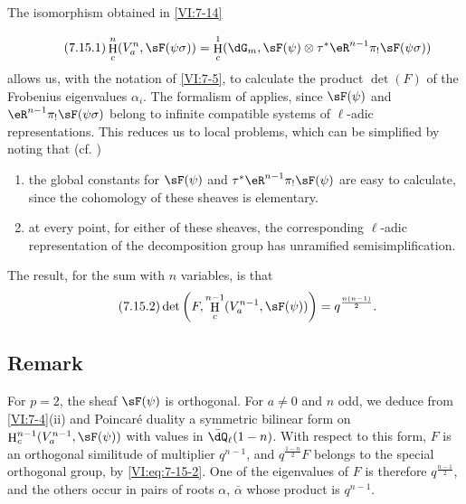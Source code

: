 \documentclass[oneside]{book}
\DeclareMathOperator{\h}{H}
\theoremstyle{sga-source}
\theoremstyle{sga-source-dash}
\theoremstyle{sga-source-dotdash}
\theoremstyle{sga-source-number-note-dash}
\theoremstyle{sga-source-note-number-dotdash}
\theoremstyle{sga-source-example-dotdash}
\theoremstyle{sga-source-inline-number}
\theoremstyle{sga-source-bare-number}
\theoremstyle{sga-source}
\newcommand{\PrintPage}[1]{}\newcommand{\MathPage}[1]{}\newcommand{\PrintCite}[2]{#1}\newcommand{\var}[3]{#2}
\begin{document}
The isomorphism obtained in \ref{VI:7-14} 
\PrintPage{226}
\begin{equation*}\tag{7.15.1}\label{VI:eq:7-15-1}
  \h_c^n(V_a^n,\sF(\psi\sigma)) = \h_c^1(\dG_m,\sF(\psi)\otimes \tau^\ast \eR^{n-1} \pi_! \sF(\psi\sigma)) 
\end{equation*}
allows us, with the notation of \ref{VI:7-5}, to calculate the product $\det(F)$ 
of the Frobenius eigenvalues $\alpha_i$. The formalism of \cite{de73} 
applies, since $\sF(\psi)$ and $\eR^{n-1} \pi_! \sF(\psi\sigma)$ 
belong to infinite compatible systems of $\ell$-adic 
representations. This reduces us to local problems, which can be 
simplified by noting that (cf. \cite[9.5]{de73}) 
\begin{enumerate}[\indent a)]
  \item the global constants for 
    $\sF(\psi)$ and $\tau^\ast \eR^{n-1} \pi_! \sF(\psi)$ are easy to calculate, since the cohomology of these sheaves is elementary. 
  \item at every point, for either of these sheaves, the 
    corresponding $\ell$-adic representation of the decomposition group 
    has unramified semisimplification. 
\end{enumerate}

The result, for the sum with $n$ variables, is that 
\begin{equation*}\tag{7.15.2}\label{VI:eq:7-15-2}
  \det\left(F,\h_c^{n-1}(V_a^{n-1},\sF(\psi))\right) = q^{\frac{n(n-1)}{2}} \text{.} 
\end{equation*}





\subsection{Remark}\label{VI:7-16}

For $p=2$, the sheaf $\sF(\psi)$ is orthogonal. For $a\ne 0$ and $n$ 
odd, we deduce from \ref{VI:7-4}(ii) and Poincaré duality a 
symmetric bilinear form on $\h_c^{n-1}(V_a^{n-1},\sF(\psi))$ with 
values in $\bar\dQ_\ell(1-n)$. With respect to this form, $F$ is an 
orthogonal similitude of multiplier $q^{n-1}$, and $q^{\frac{1-n}{2}} F$ 
belongs to the special orthogonal group, by \eqref{VI:eq:7-15-2}. One 
of the \var{eigenvalues of $F$ is therefore $q^{\frac{1-n}{2}}$}{eigenvalues of $F$ is therefore $q^{\frac{n-1}{2}}$}{S45-SOL-0951}, and the others 
occur in pairs of roots $\alpha$, $\bar\alpha$ whose product is $q^{n-1}$. 
\end{document}

